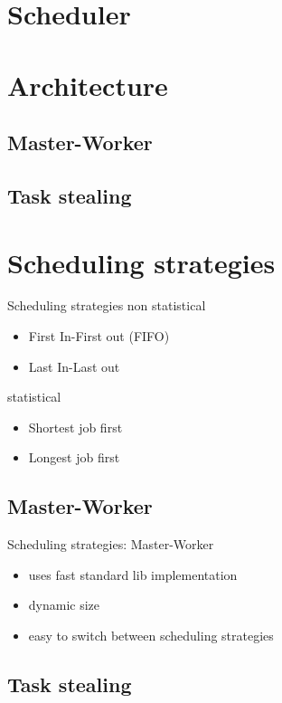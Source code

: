 \section{Scheduler}
\section{Architecture}

\subsection{Master-Worker}
	\begin{frame}
		
	\end{frame}
\subsection{Task stealing}
	\begin{frame}
	\end{frame}
\section{Scheduling strategies}

	\begin{frame}{Scheduling strategies}
		non statistical
		\begin{itemize}
			\item First In-First out (FIFO)
			\item Last In-Last out
		\end{itemize}
		statistical
		\begin{itemize}
			\item Shortest job first
			\item Longest job first
		\end{itemize}
	\end{frame}
\subsection{Master-Worker}
	\begin{frame}{Scheduling strategies: Master-Worker}
		\begin{itemize}
			\item uses fast standard lib implementation
			\item dynamic size
			\item easy to switch between scheduling strategies
		\end{itemize}
	\end{frame}
\subsection{Task stealing}
	\begin{frame}
	\end{frame}
